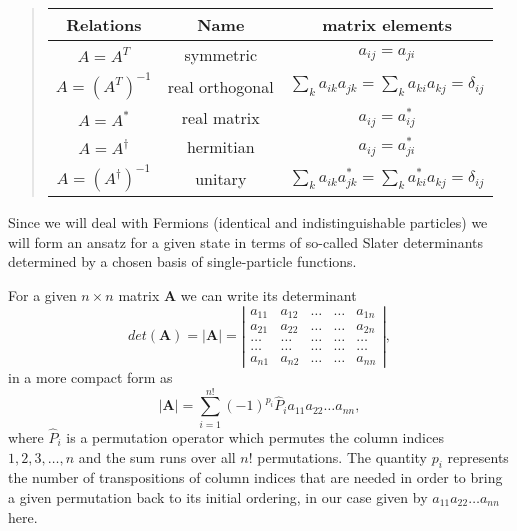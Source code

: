 \begin{quote}
\begin{tabular}{ccc}
\hline
\multicolumn{1}{c}{ Relations } & \multicolumn{1}{c}{ Name } & \multicolumn{1}{c}{ matrix elements } \\
\hline
$A = A^{T}$                            & symmetric       & $a_{ij} = a_{ji}$                                                       \\
$A = \left (A^{T} \right )^{-1}$       & real orthogonal & $\sum_k a_{ik} a_{jk} = \sum_k a_{ki} a_{kj} = \delta_{ij}$             \\
$A = A^{ * }$                          & real matrix     & $a_{ij} = a_{ij}^{ * }$                                                 \\
$A = A^{\dagger}$                      & hermitian       & $a_{ij} = a_{ji}^{ * }$                                                 \\
$A = \left (A^{\dagger} \right )^{-1}$ & unitary         & $\sum_k a_{ik} a_{jk}^{ * } = \sum_k a_{ki}^{ * } a_{kj} = \delta_{ij}$ \\
\hline
\end{tabular}
\end{quote}

\noindent
Since we will deal with Fermions (identical and indistinguishable particles) we will 
form an ansatz for a given state in terms of so-called Slater determinants determined
by a chosen basis of single-particle functions. 

For a given $n\times n$ matrix $\mathbf{A}$ we can write its determinant
\[
   det(\mathbf{A})=|\mathbf{A}|=
\left| \begin{array}{ccccc} a_{11}& a_{12}& \dots & \dots & a_{1n}\\
                            a_{21}&a_{22}& \dots & \dots & a_{2n}\\  
                            \dots & \dots & \dots & \dots & \dots \\
                            \dots & \dots & \dots & \dots & \dots \\
                            a_{n1}& a_{n2}& \dots & \dots & a_{nn}\end{array} \right|,
\]
in a more compact form as 
\[
|\mathbf{A}|= \sum_{i=1}^{n!}(-1)^{p_i}\hat{P}_i a_{11}a_{22}\dots a_{nn},
\]
where $\hat{P}_i$ is a permutation operator which permutes the column indices $1,2,3,\dots,n$
and the sum runs over all $n!$ permutations.  The quantity $p_i$ represents the number of transpositions of column indices that are needed in order to bring a given permutation back to its initial ordering, in our case given by $a_{11}a_{22}\dots a_{nn}$ here.

